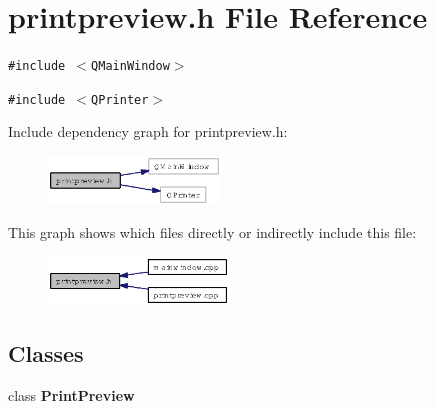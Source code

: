 \section{printpreview.h File Reference}
\label{printpreview_8h}
{\tt \#include $<$QMain\-Window$>$}\par
{\tt \#include $<$QPrinter$>$}\par


Include dependency graph for printpreview.h:\begin{figure}[H]
\begin{center}
\leavevmode
\includegraphics[width=130pt]{printpreview_8h__incl}
\end{center}
\end{figure}


This graph shows which files directly or indirectly include this file:\begin{figure}[H]
\begin{center}
\leavevmode
\includegraphics[width=136pt]{printpreview_8h__dep__incl}
\end{center}
\end{figure}
\subsection*{Classes}
\begin{CompactItemize}
\item 
class {\bf Print\-Preview}
\end{CompactItemize}
